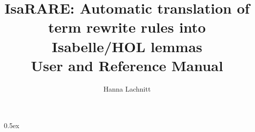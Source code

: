 \documentclass[11pt,a4paper]{article}
\begin{document}
\title{IsaRARE: Automatic translation of term rewrite rules into Isabelle/HOL lemmas\\[1em] User and Reference Manual}

\author{Hanna Lachnitt}
\maketitle

\tableofcontents

\parindent 0pt\parskip 0.5ex





\end{document}
